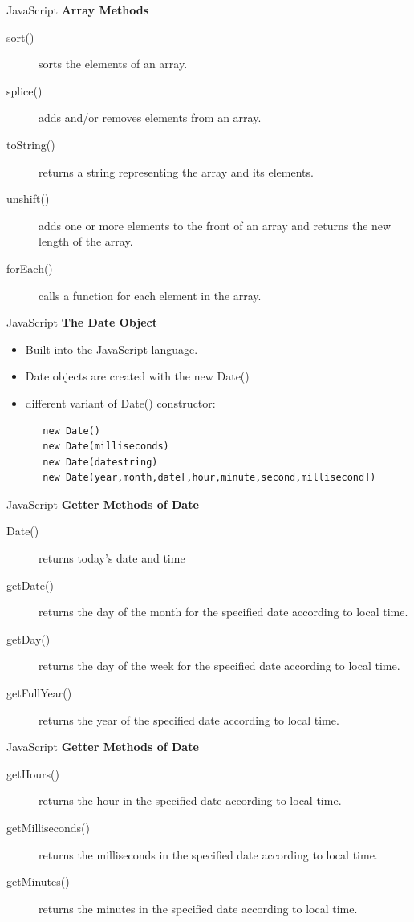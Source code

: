 \documentclass[14pt]{beamer}
\begin{document}
\begin{frame}{JavaScript}
\textbf{Array Methods}
\begin{description}
 \item [sort()] sorts the elements of an array.
 \item [splice()] adds and/or removes elements from an array.
 \item [toString()] returns a string representing the array and its elements.
 \item [unshift()] adds one or more elements to the front of an array and returns the new length of the array.
 \item [forEach()] calls a function for each element in the array.
\end{description}
\end{frame}

\begin{frame}[fragile]{JavaScript}
\textbf{The Date Object}
\begin{itemize}
 \item Built into the JavaScript language.
 \item Date objects are created with the new Date()
 \item different variant of Date() constructor:
 \begin{block}{}
  \begin{lstlisting}
   new Date()
   new Date(milliseconds)
   new Date(datestring)
   new Date(year,month,date[,hour,minute,second,millisecond])
  \end{lstlisting}
 \end{block}
\end{itemize}
\end{frame}

\begin{frame}{JavaScript}
\textbf{Getter Methods of Date}
\begin{description}
 \item [Date()] returns today's date and time
 \item [getDate()] returns the day of the month for the specified date according to local time.
 \item [getDay()] returns the day of the week for the specified date according to local time.
 \item [getFullYear()] returns the year of the specified date according to local time.
\end{description}
\end{frame}

\begin{frame}{JavaScript}
\textbf{Getter Methods of Date}
\begin{description}
 \item [getHours()] returns the hour in the specified date according to local time.
 \item [getMilliseconds()] returns the milliseconds in the specified date according to local time.
 \item [getMinutes()] returns the minutes in the specified date according to local time.
\end{description}
\end{frame}
\end{document}
